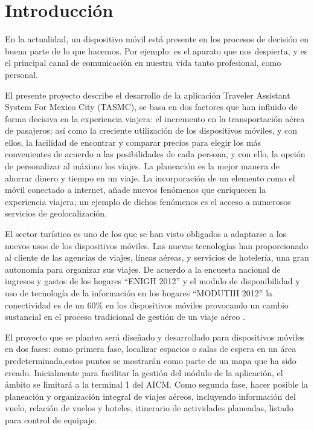 
\chapter{Introducción} %

\label{Introduccion} %



En la actualidad, un dispositivo móvil está presente en los procesos de decisión en buena parte de lo que hacemos. Por ejemplo: es el aparato que nos despierta, y es el principal canal de comunicación en nuestra vida tanto profesional, como personal.

El presente proyecto describe el desarrollo de la aplicación Traveler Assistant System For Mexico City (TASMC), se basa en dos factores que han influido de forma decisiva en la experiencia viajera: el incremento en la transportación aérea de pasajeros; así como la creciente utilización de los dispositivos móviles, y con ellos, la facilidad de encontrar y comparar precios para elegir los más convenientes de acuerdo a las posibilidades de cada persona, y con ello, la opción de personalizar al máximo los viajes. La planeación es la mejor manera de ahorrar dinero y tiempo en un viaje. La incorporación de un elemento como el móvil conectado a internet, añade  nuevos fenómenos que enriquecen la experiencia viajera; un ejemplo de dichos fenómenos es el acceso a numerosos servicios de geolocalización.

El sector turístico es uno de los que se han visto obligados a adaptarse a los nuevos usos de los dispositivos móviles. Las nuevas tecnologías han proporcionado al cliente de las agencias de viajes, líneas aéreas, y servicios de hotelería, una gran autonomía \cite{appsVIajar} para organizar sus viajes. De acuerdo a la encuesta nacional de ingresos y gastos de los hogares “ENIGH 2012” y el modulo de disponibilidad y uso de tecnología de la información en los hogares “MODUTIH 2012” la conectividad es de un 60\% en los dispositivos móviles provocando un cambio sustancial en el proceso tradicional de gestión de un viaje aéreo \cite{endutih}.

El proyecto que se plantea será diseñado y desarrollado para dispositivos móviles en dos fases: como primera fase, localizar espacios o salas de espera en un área predeterminada,estos puntos se mostrarán como parte de un mapa que ha sido creado. Inicialmente para facilitar la gestión del módulo de la aplicación, el ámbito se limitará a la terminal 1 del AICM. Como segunda fase, hacer posible la planeación y organización integral de viajes aéreos, incluyendo información del vuelo, relación de vuelos y hoteles, itinerario de actividades planeadas, listado para control de equipaje.


